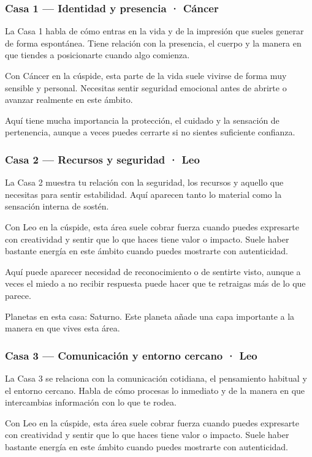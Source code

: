 \documentclass[11pt,a4paper]{article}
\begin{document}
\subsubsection*{Casa 1 — Identidad y presencia · Cáncer}
La Casa 1 habla de cómo entras en la vida y de la impresión que sueles generar de forma espontánea. Tiene relación con la presencia, el cuerpo y la manera en que tiendes a posicionarte cuando algo comienza.

Con Cáncer en la cúspide, esta parte de la vida suele vivirse de forma muy sensible y personal. Necesitas sentir seguridad emocional antes de abrirte o avanzar realmente en este ámbito.

Aquí tiene mucha importancia la protección, el cuidado y la sensación de pertenencia, aunque a veces puedes cerrarte si no sientes suficiente confianza.

\subsubsection*{Casa 2 — Recursos y seguridad · Leo}
La Casa 2 muestra tu relación con la seguridad, los recursos y aquello que necesitas para sentir estabilidad. Aquí aparecen tanto lo material como la sensación interna de sostén.

Con Leo en la cúspide, esta área suele cobrar fuerza cuando puedes expresarte con creatividad y sentir que lo que haces tiene valor o impacto. Suele haber bastante energía en este ámbito cuando puedes mostrarte con autenticidad.

Aquí puede aparecer necesidad de reconocimiento o de sentirte visto, aunque a veces el miedo a no recibir respuesta puede hacer que te retraigas más de lo que parece.

Planetas en esta casa: Saturno. Este planeta añade una capa importante a la manera en que vives esta área.

\subsubsection*{Casa 3 — Comunicación y entorno cercano · Leo}
La Casa 3 se relaciona con la comunicación cotidiana, el pensamiento habitual y el entorno cercano. Habla de cómo procesas lo inmediato y de la manera en que intercambias información con lo que te rodea.

Con Leo en la cúspide, esta área suele cobrar fuerza cuando puedes expresarte con creatividad y sentir que lo que haces tiene valor o impacto. Suele haber bastante energía en este ámbito cuando puedes mostrarte con autenticidad.
\end{document}
